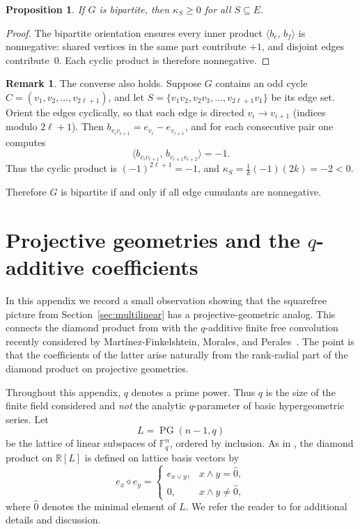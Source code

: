 \documentclass[11pt]{amsart}
\newtheorem{prop}[thm]{Proposition}
\theoremstyle{definition}
\newtheorem{remark}[thm]{Remark}
\newcommand{\R}{\mathbb{R}}
\newcommand{\ip}[2]{\langle #1,\, #2 \rangle}
\DeclareMathOperator{\PG}{PG}
\begin{document}
\begin{prop}\label{prop:bipartite}
If $G$ is bipartite, then $\kappa_S \ge 0$ for all
$S\subseteq E$.
\end{prop}

\begin{proof}
The bipartite orientation ensures every inner product $\ip{b_e}{b_f}$ is nonnegative: shared vertices in the same part contribute $+1$, and disjoint edges contribute~$0$.  Each cyclic product is therefore nonnegative.
\end{proof}

\begin{remark}\label{rem:bipartite-necessary}
The converse also holds.  Suppose $G$ contains an odd cycle $C = (v_1,v_2,\dots,v_{2\ell+1})$, and let $S = \{v_1v_2, v_2v_3,\dots,v_{2\ell+1}v_1\}$ be its edge set. Orient the edges cyclically, so that each edge is directed $v_i \to v_{i+1}$ (indices modulo $2\ell+1$).  Then $b_{v_i v_{i+1}} = e_{v_i} - e_{v_{i+1}}$, and for each consecutive pair one computes
\[
  \ip{b_{v_i v_{i+1}}}{b_{v_{i+1} v_{i+2}}} = -1.
\]
Thus the cyclic product is $(-1)^{2\ell+1} = -1$, and $\kappa_S = \frac{1}{k}(-1)(2k) = -2< 0$.

Therefore $G$ is bipartite if and only if all edge cumulants are nonnegative.
\end{remark}


\appendix

\section{Projective geometries and the \(q\)-additive coefficients}

In this appendix we record a small observation showing that the squarefree picture from Section~\ref{sec:multilinear} has a projective-geometric analog. This connects the diamond product from \cite{Sin26} with the $q$-additive finite free convolution recently considered by Mart\'inez-Finkelshtein, Morales, and Perales~\cite{MFMP26}.  The point is that the coefficients of the latter arise naturally from the rank-radial part of the diamond product on projective geometries.


Throughout this appendix, $q$ denotes a prime power.  Thus $q$ is the size of the finite field considered and \emph{not} the analytic $q$-parameter of basic hypergeometric series. Let
\[
    L=\PG(n-1,q)
\]
be the lattice of linear subspaces of $\mathbb F_q^n$, ordered by inclusion.  As in \cite{Sin26}, the diamond product on $\R[L]$ is
defined on lattice basis vectors by
\[
    e_x\diamond e_y
    =
    \begin{cases}
        e_{x\vee y}, & x\wedge y=\hat 0,\\
        0, & x\wedge y\neq \hat 0,
    \end{cases}
\]
where $\hat 0$ denotes the minimal element of $L$. We refer the reader to \cite{Sin26} for additional details and discussion.
\end{document}
